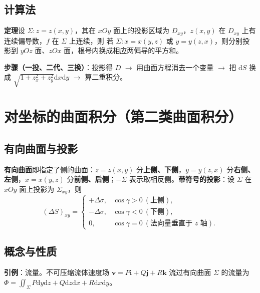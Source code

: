 \subsection{计算法}

\textbf{定理}\quad 设 $\Sigma:z=z(x,y)$，其在 $xOy$ 面上的投影区域为 $D_{xy}$，$z(x,y)$ 在 $D_{xy}$ 上有连续偏导数，$f$ 在 $\Sigma$ 上连续，则
若 $\Sigma:x=x(y,z)$ 或 $y=y(z,x)$，则分别投影到 $yOz$ 面、$zOx$ 面，根号内换成相应两偏导的平方和。

\textbf{步骤（一投、二代、三换）}：投影得 $D$ $\to$ 用曲面方程消去一个变量 $\to$ 把 $\mathrm{d}S$ 换成 $\sqrt{1+z_x^2+z_y^2}\mathrm{d}x\mathrm{d}y$ $\to$ 算二重积分。


\section{对坐标的曲面积分（第二类曲面积分）}
\subsection{有向曲面与投影}

\textbf{有向曲面}即指定了侧的曲面：$z=z(x,y)$ 分\textbf{上侧、下侧}，$y=y(z,x)$ 分\textbf{右侧、左侧}，$x=x(y,z)$ 分\textbf{前侧、后侧}；$-\Sigma$ 表示取相反侧。\textbf{带符号的投影}：设 $\Sigma$ 在 $xOy$ 面上投影为 $\Sigma_{xy}$，则
\[
(\Delta S)_{xy}=
\begin{cases}
+\Delta\sigma, & \cos\gamma>0\ (\text{上侧}),\\
-\Delta\sigma, & \cos\gamma<0\ (\text{下侧}),\\
0, & \cos\gamma=0\ (\text{法向量垂直于 }z\text{ 轴}).
\end{cases}
\]

\subsection{概念与性质}

\textbf{引例}：流量。不可压缩流体速度场 $\boldsymbol v=P\boldsymbol i+Q\boldsymbol j+R\boldsymbol k$ 流过有向曲面 $\Sigma$ 的流量为 $\Phi=\iint_\Sigma P\mathrm{d}y\mathrm{d}z+Q\mathrm{d}z\mathrm{d}x+R\mathrm{d}x\mathrm{d}y$。

